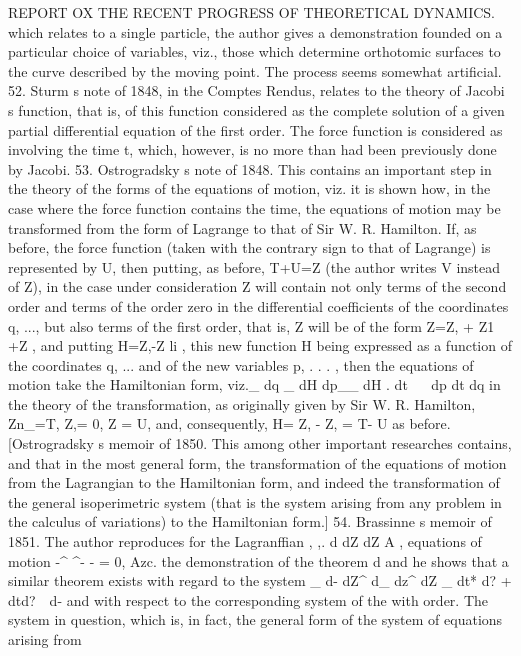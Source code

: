 \documentclass[11pt,a4paper]{book}
\begin{document}
REPORT OX THE RECENT PROGRESS OF THEORETICAL DYNAMICS.
which
relates
to
a
single
particle,
the
author
gives
a
demonstration
founded
on
a
particular
choice
of
variables,
viz.,
those
which
determine
orthotomic
surfaces
to
the
curve described by the moving
point.
The
process seems somewhat
artificial.
52.
Sturm s
note
of
1848,
in the
Comptes Rendus,
relates
to
the
theory of
Jacobi s
function,
that
is,
of
this
function
considered
as
the
complete
solution
of
a
given
partial
differential
equation
of
the
first
order.
The
force
function
is
considered
as
involving
the
time
t,
which,
however,
is
no
more
than
had
been
previously
done
by
Jacobi.
53.
Ostrogradsky s note
of
1848.
This
contains
an
important
step
in
the
theory
of
the
forms
of
the
equations
of
motion,
viz.
it
is
shown
how,
in the
case where
the
force function
contains
the
time, the
equations
of motion may be transformed from the
form
of
Lagrange
to
that
of
Sir
W.
R.
Hamilton.
If,
as
before,
the
force
function
(taken
with
the
contrary sign
to
that
of Lagrange)
is represented by
U,
then putting,
as
before, T+U=Z (the author writes V instead
of Z),
in
the case under
consideration
Z will
contain not
only terms
of
the second
order
and
terms
of
the
order
zero
in
the
differential
coefficients
of
the
coordinates
q,
...,
but
also
terms
of
the
first
order, that
is, Z
will
be
of
the
form Z=Z, + Z1 +Z
,
and
putting H=Z,-Z
li ,
this new function
H being
expressed
as
a
function
of
the
coordinates
q, ...
and
of
the
new
variables
p,
.
.
.
, then the equations
of motion take the Hamiltonian
form,
viz._
dq _ dH
dp__ dH
.
dt ~
~dp
dt
dq
in
the
theory
of
the
transformation,
as
originally
given
by
Sir
W.
R.
Hamilton,
Zn_=T, Z,= 0, Z = U, and, consequently, H= Z, - Z, = T- U as
before.
[Ostrogradsky s
memoir
of
1850.
This
among
other
important
researches
contains,
and
that
in
the
most
general
form,
the
transformation
of
the
equations
of
motion
from
the
Lagrangian
to
the
Hamiltonian
form,
and
indeed
the
transformation
of
the
general
isoperimetric
system
(that
is
the
system
arising
from
any
problem
in
the
calculus
of
variations)
to
the
Hamiltonian
form.]
54.
Brassinne s
memoir
of
1851.
The
author
reproduces
for
the
Lagranffian
,
,.
d dZ
dZ
A
,
equations
of motion
-^ ^- -
= 0,
Azc.
the demonstration
of the theorem
d
and he shows that a similar theorem
exists with
regard
to the system
_
d-
dZ^
d_
dz^
dZ _
dt* d? + dtd?~~d-
and
with
respect
to
the
corresponding
system
of
the
with
order.
The
system
in
question,
which
is,
in
fact,
the
general
form
of
the
system
of
equations
arising
from

\end{document}
